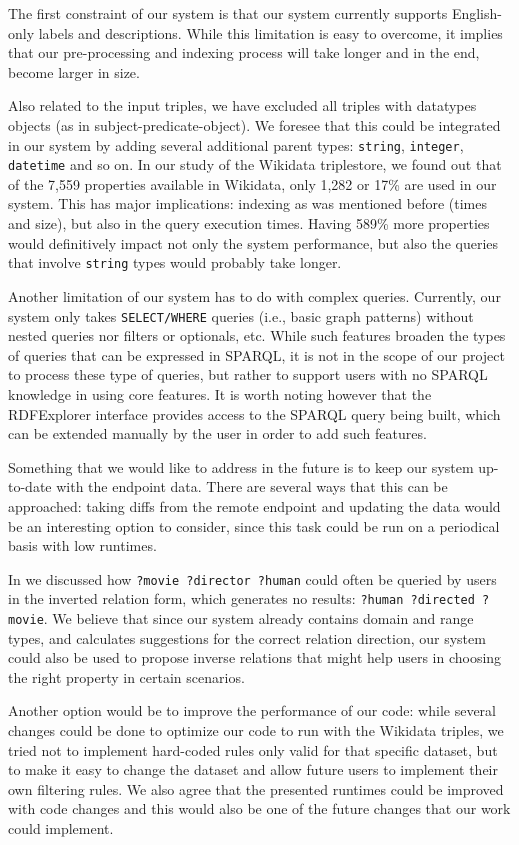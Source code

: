 The first constraint of our system is that our system currently supports English-only labels and descriptions. While this limitation is easy to overcome, it implies that our pre-processing and indexing process will take longer and in the end, become larger in size. 

Also related to the input triples, we have excluded all triples with datatypes objects (as in subject-predicate-object). We foresee that this could be integrated in our system by adding several additional parent types: \texttt{string}, \texttt{integer}, \texttt{datetime} and so on. In our study of the Wikidata triplestore, we found out that of the 7,559 properties available in Wikidata, only 1,282 or 17\% are used in our system. This has major implications: indexing as was mentioned before (times and size), but also in the query execution times. Having 589\% more properties would definitively impact not only the system performance, but also the queries that involve \texttt{string} types would probably take longer.

Another limitation of our system has to do with complex queries. Currently, our system only takes \texttt{SELECT/WHERE} queries (i.e., basic graph patterns) without nested queries nor filters or optionals, etc. While such features broaden the types of queries that can be expressed in SPARQL, it is not in the scope of our project to process these type of queries, but rather to support users with no SPARQL knowledge in using core features. It is worth noting however that the RDFExplorer interface provides access to the SPARQL query being built, which can be extended manually by the user in order to add such features.

Something that we would like to address in the future is to keep our system up-to-date with the endpoint data. There are several ways that this can be approached: taking diffs from the remote endpoint and updating the data would be an interesting option to consider, since this task could be run on a periodical basis with low runtimes. 

In  we discussed how \texttt{?movie ?director ?human} could often be queried by users in the inverted relation form, which generates no results: \texttt{?human ?directed ?movie}. We believe that since our system already contains domain and range types, and calculates suggestions for the correct relation direction, our system could also be used to propose inverse relations that might help users in choosing the right property in certain scenarios.

Another option would be to improve the performance of our code: while several changes could be done to optimize our code to run with the Wikidata triples, we tried not to implement hard-coded rules only valid for that specific dataset, but to make it easy to change the dataset and allow future users to implement their own filtering rules. We also agree that the presented runtimes could be improved with code changes and this would also be one of the future changes that our work could implement.